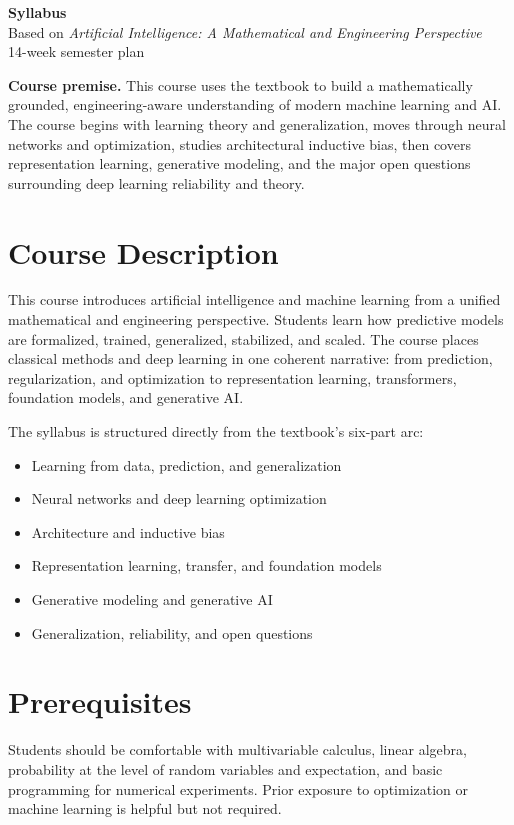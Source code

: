 \documentclass[11pt]{article}
\newcommand{\syllabustitle}[1]{%
  \begin{center}
    {\LARGE\bfseries\color{accent} #1}\\[0.4em]
    {\large Based on \emph{Artificial Intelligence: A Mathematical and Engineering Perspective}}\\[0.3em]
    {\normalsize 14-week semester plan}
  \end{center}
}
\newcommand{\infobox}[1]{%
  \vspace{0.4em}
  \noindent
  \colorbox{lightaccent}{\parbox{\dimexpr\linewidth-2\fboxsep\relax}{#1}}
  \vspace{0.4em}
}
\begin{document}
\syllabustitle{Syllabus}

\infobox{\textbf{Course premise.} This course uses the textbook to build a mathematically grounded, engineering-aware understanding of modern machine learning and AI. The course begins with learning theory and generalization, moves through neural networks and optimization, studies architectural inductive bias, then covers representation learning, generative modeling, and the major open questions surrounding deep learning reliability and theory.}

\section{Course Description}
This course introduces artificial intelligence and machine learning from a unified mathematical and engineering perspective. Students learn how predictive models are formalized, trained, generalized, stabilized, and scaled. The course places classical methods and deep learning in one coherent narrative: from prediction, regularization, and optimization to representation learning, transformers, foundation models, and generative AI.

The syllabus is structured directly from the textbook's six-part arc:
\begin{itemize}
  \item Learning from data, prediction, and generalization
  \item Neural networks and deep learning optimization
  \item Architecture and inductive bias
  \item Representation learning, transfer, and foundation models
  \item Generative modeling and generative AI
  \item Generalization, reliability, and open questions
\end{itemize}

\section{Prerequisites}
Students should be comfortable with multivariable calculus, linear algebra, probability at the level of random variables and expectation, and basic programming for numerical experiments. Prior exposure to optimization or machine learning is helpful but not required.
\end{document}

